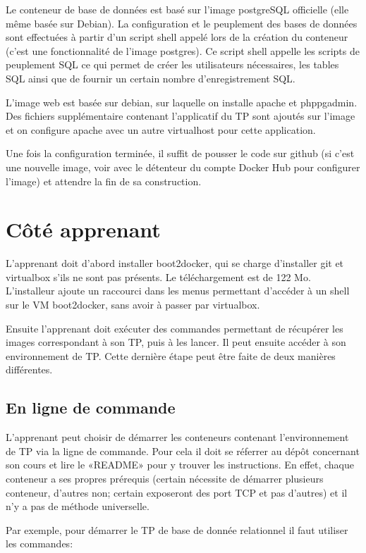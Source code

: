\documentclass[a4paper,11pt]{report}
\begin{document}
Le conteneur de base de données est basé sur l'image postgreSQL officielle (elle même basée sur Debian). La configuration et le peuplement des bases de données sont effectuées à partir d'un script shell appelé lors de la création du conteneur (c'est une fonctionnalité de l'image postgres). Ce script shell appelle les scripts de peuplement SQL ce qui permet de créer les utilisateurs nécessaires, les tables SQL ainsi que de fournir un certain nombre d'enregistrement SQL.

L'image web est basée sur debian, sur laquelle on installe apache et phppgadmin. Des fichiers supplémentaire contenant l'applicatif du TP sont ajoutés sur l'image et on configure apache avec un autre virtualhost pour cette application.

Une fois la configuration terminée, il suffit de pousser le code sur github (si c'est une nouvelle image, voir avec le détenteur du compte Docker Hub pour configurer l'image) et attendre la fin de sa construction.

\section{Côté apprenant}

L'apprenant doit d'abord installer boot2docker, qui se charge d'installer git et virtualbox s'ils ne sont pas présents. Le téléchargement est de 122 Mo. L'installeur ajoute un raccourci dans les menus permettant d'accéder à un shell sur le VM boot2docker, sans avoir à passer par virtualbox. 

Ensuite l'apprenant doit exécuter des commandes permettant de récupérer les images correspondant à son TP, puis à les lancer. Il peut ensuite accéder à son environnement de TP. Cette dernière étape peut être faite de deux manières différentes.

\subsection{En ligne de commande}

L'apprenant peut choisir de démarrer les conteneurs contenant l'environnement de TP via la ligne de commande. Pour cela il doit se réferrer au dépôt concernant son cours et lire le «README» pour y trouver les instructions. En effet, chaque conteneur a ses propres prérequis (certain nécessite de démarrer plusieurs conteneur, d'autres non; certain exposeront des port TCP et pas d'autres) et il n'y a pas de méthode universelle.

Par exemple, pour démarrer le TP de base de donnée relationnel il faut utiliser les commandes:
\end{document}
